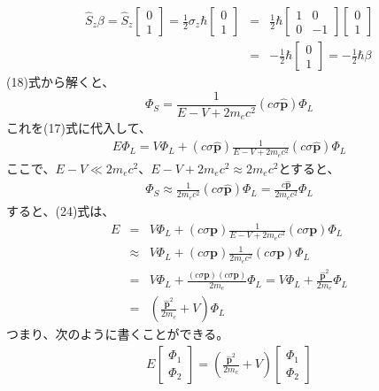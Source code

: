 \documentclass[10pt]{jreport}
\begin{document}
\begin{eqnarray}
\hat{S}_z \beta = \hat{S}_z \left[
\begin{array}{r}
0 \\
1 
\end{array}
\right ] = \frac{1}{2} \sigma_z \hbar \left[
\begin{array}{r}
0 \\
1 
\end{array}
\right ] &=&\frac{1}{2}\hbar \left[
\begin{array}{rr}
1 & 0 \\
0 & -1 
\end{array}
\right ] \left [
\begin{array}{r}
0 \\
1 
\end{array}
\right ] \nonumber \\
&=& -\frac{1}{2}\hbar \left [
\begin{array}{r}
0 \\
1 
\end{array}
\right ]  = -\frac{1}{2}\hbar \beta
\end{eqnarray}
(18)式から解くと、
\begin{equation}
\Phi_S = \frac{1}{E-V+2m_ec^2}(c\sigma \hat{\textbf{p}})\Phi_L
\end{equation}
これを(17)式に代入して、
\begin{eqnarray}
E\Phi_L =V\Phi_L +(c\sigma \hat{\textbf{p}})\frac{1}{E-V+2m_ec^2}(c\sigma \hat{\textbf{p}})\Phi_L
\end{eqnarray}
ここで、$E-V \ll 2m_ec^2$、$E-V+2m_ec^2 \approx 2m_ec^2 $とすると、
\begin{eqnarray}
\Phi_S \approx \frac{1}{2m_ec^2}(c\sigma \hat{\textbf{p}})\Phi_L = \frac{c\hat{\textbf{p}}}{2m_ec^2}\Phi_L
\end{eqnarray}
すると、(24)式は、
\begin{eqnarray}
E &=& V\Phi_L +(c\sigma \textbf{p})\frac{1}{E-V+2m_ec^2}(c\sigma \textbf{p})\Phi_L \nonumber \\
&\approx & V\Phi_L +(c\sigma \textbf{p})\frac{1}{2m_ec^2}(c\sigma \textbf{p})\Phi_L \nonumber \\
&=& V\Phi_L+\frac{(c\sigma \textbf{p})(c\sigma \textbf{p})}{2m_e}\Phi_L = V\Phi_L +\frac{\hat{\textbf{p}}^2}{2m_e}\Phi_L \nonumber \\
&=& (\frac{\hat{\textbf{p}}^2}{2m_e}+V)\Phi_L 
\end{eqnarray}
つまり、次のように書くことができる。
\begin{eqnarray}
E \left [
\begin{array}{r}
\Phi_1 \\
\Phi_2
\end{array}
\right ] =  (\frac{\hat{\textbf{p}}^2}{2m_e}+V) \left [
\begin{array}{r}
\Phi_1 \\
\Phi_2
\end{array}
\right ] 
\end{eqnarray}
\end{document}

